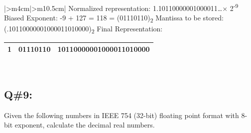 \begin{center}
\begin{tabular}{|>{\centering\arraybackslash}m{4cm}|>{\arraybackslash}m{10.5cm}|}
Normalized representation: 1.10110000001000011\ldots × 2\textsuperscript{-9} \newline
Biased Exponent: -9 + 127 = 118 = (01110110)\textsubscript{2} \newline
Mantissa to be stored: (.10110000001000011010000)\textsubscript{2} \newline
Final Representation: \newline
\begin{tabular}{|c|c|c|}
\hline
1 & 01110110 & 10110000001000011010000 \\
\hline
\end{tabular}
\\
\hline
\end{tabular}
\end{center}


\subsection*{Q\#9:}
Given the following numbers in IEEE 754 (32-bit) floating point format with 8-bit exponent, calculate the decimal real numbers.

